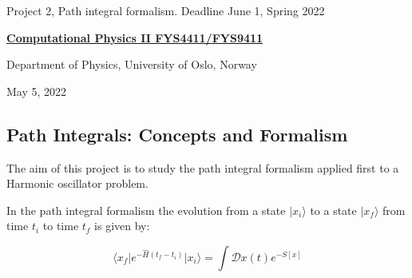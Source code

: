 \documentclass[%
oneside,                 %
final,                   %
10pt]{article}
\begin{document}

\newcommand{\exercisesection}[1]{\subsection*{#1}}






\thispagestyle{empty}

\begin{center}
{\LARGE\bf
\begin{spacing}{1.25}
Project 2, Path integral formalism. Deadline June 1, Spring 2022
\end{spacing}
}
\end{center}


\begin{center}
{\bf \href{{http://www.uio.no/studier/emner/matnat/fys/FYS4411/index-eng.html}}{Computational Physics II FYS4411/FYS9411}}
\end{center}

    \begin{center}
\centerline{{\small Department of Physics, University of Oslo, Norway}}
\end{center}
    

\begin{center}
May 5, 2022
\end{center}

\vspace{1cm}


\subsection{Path Integrals: Concepts and Formalism}

The aim of this project is to study the path integral formalism applied first to a Harmonic oscillator problem.

In the path integral formalism the evolution from a state $\vert x_i\rangle$
to a state $\vert  x_f\rangle$ from time $t_i$ to time $t_f$ is given by:

\[
	\langle x_f\vert e^{-\hat{H}(t_f-t_i)}\vert x_i\rangle = \int \mathcal{D} x(t) e^{-S[x]}
\]
\end{document}
